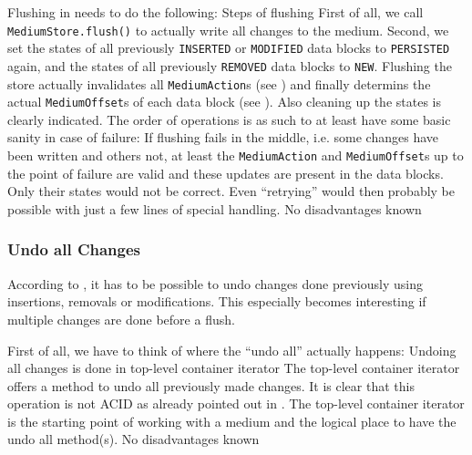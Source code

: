 Flushing in \COMPdataPartManagement{} needs to do the following:
{%
Steps of flushing
}
{%
First of all, we call \texttt{MediumStore.flush()} to actually write all changes to the medium. Second, we set the states of all previously \texttt{INSERTED} or \texttt{MODIFIED} data blocks to \texttt{PERSISTED} again, and the states of all previously \texttt{REMOVED} data blocks to \texttt{NEW}.
}
{%
Flushing the store actually invalidates all \texttt{MediumAction}s (see ) and finally determins the actual \texttt{MediumOffset}s of each data block (see ). Also cleaning up the states is clearly indicated. The order of operations is as such to at least have some basic sanity in case of failure: If flushing fails in the middle, i.e. some changes have been written and others not, at least the \texttt{MediumAction} and \texttt{MediumOffset}s up to the point of failure are valid and these updates are present in the data blocks. Only their states would not be correct. Even ``retrying'' would then probably be possible with just a few lines of special handling.
}
{%
No disadvantages known
}

\subsubsection{Undo all Changes}%
\label{sec:UndoallChanges}%

According to , it has to be possible to undo changes done previously using insertions, removals or modifications. This especially becomes interesting if multiple changes are done before a flush.

First of all, we have to think of where the ``undo all'' actually happens:
{%
Undoing all changes is done in top-level container iterator
}
{%
The top-level container iterator offers a method to undo all previously made changes. It is clear that this operation is not ACID as already pointed out in .
}
{%
The top-level container iterator is the starting point of working with a medium and the logical place to have the undo all method(s).
}
{%
No disadvantages known
}

